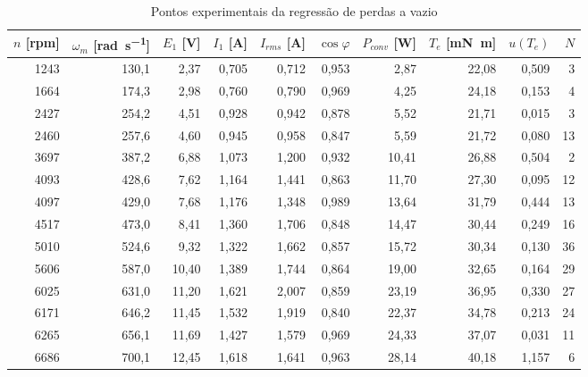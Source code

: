 \begin{table}[H]
    \centering
    \caption{Pontos experimentais da regressão de perdas a vazio}
    \label{tab:bancada_patamares}
    \small
    \begin{tabular}{rrrrrrrrrr}
        \toprule
        \textbf{$n$ [rpm]} & \textbf{$\omega_m$ [\si{\radian\per\second}]} & \textbf{$E_1$ [\si{\volt}]} & \textbf{$I_1$ [\si{\ampere}]} & \textbf{$I_{rms}$ [\si{\ampere}]} & \textbf{$\cos\varphi$} & \textbf{$P_{conv}$ [\si{\watt}]} & \textbf{$T_e$ [\si{\milli\newton\meter}]} & \textbf{$u(T_e)$} & \textbf{$N$} \\
        \midrule
        1243 & 130{,}1 & 2{,}37 & 0{,}705 & 0{,}712 & 0{,}953 & 2{,}87 & 22{,}08 & 0{,}509 & 3 \\
        1664 & 174{,}3 & 2{,}98 & 0{,}760 & 0{,}790 & 0{,}969 & 4{,}25 & 24{,}18 & 0{,}153 & 4 \\
        2427 & 254{,}2 & 4{,}51 & 0{,}928 & 0{,}942 & 0{,}878 & 5{,}52 & 21{,}71 & 0{,}015 & 3 \\
        2460 & 257{,}6 & 4{,}60 & 0{,}945 & 0{,}958 & 0{,}847 & 5{,}59 & 21{,}72 & 0{,}080 & 13 \\
        3697 & 387{,}2 & 6{,}88 & 1{,}073 & 1{,}200 & 0{,}932 & 10{,}41 & 26{,}88 & 0{,}504 & 2 \\
        4093 & 428{,}6 & 7{,}62 & 1{,}164 & 1{,}441 & 0{,}863 & 11{,}70 & 27{,}30 & 0{,}095 & 12 \\
        4097 & 429{,}0 & 7{,}68 & 1{,}176 & 1{,}348 & 0{,}989 & 13{,}64 & 31{,}79 & 0{,}444 & 13 \\
        4517 & 473{,}0 & 8{,}41 & 1{,}360 & 1{,}706 & 0{,}848 & 14{,}47 & 30{,}44 & 0{,}249 & 16 \\
        5010 & 524{,}6 & 9{,}32 & 1{,}322 & 1{,}662 & 0{,}857 & 15{,}72 & 30{,}34 & 0{,}130 & 36 \\
        5606 & 587{,}0 & 10{,}40 & 1{,}389 & 1{,}744 & 0{,}864 & 19{,}00 & 32{,}65 & 0{,}164 & 29 \\
        6025 & 631{,}0 & 11{,}20 & 1{,}621 & 2{,}007 & 0{,}859 & 23{,}19 & 36{,}95 & 0{,}330 & 27 \\
        6171 & 646{,}2 & 11{,}45 & 1{,}532 & 1{,}919 & 0{,}840 & 22{,}37 & 34{,}78 & 0{,}213 & 24 \\
        6265 & 656{,}1 & 11{,}69 & 1{,}427 & 1{,}579 & 0{,}969 & 24{,}33 & 37{,}07 & 0{,}031 & 11 \\
        6686 & 700{,}1 & 12{,}45 & 1{,}618 & 1{,}641 & 0{,}963 & 28{,}14 & 40{,}18 & 1{,}157 & 6 \\

\end{tabular}
\end{table}
